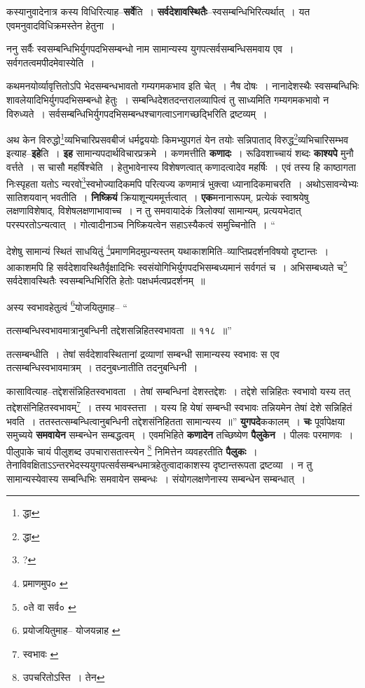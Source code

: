 \documentclass[article,12pt,a4paper]{memoir}
\begin{document}
	  \pstart कस्यानुवादेनात्र कस्य विधिरित्या\leavevmode{}ह--\textbf{सर्वे}ति । \textbf{सर्वदेशावस्थितैः}--स्वसम्बन्धिभिरित्यर्थात् । यत एवमनुवादविधिक्रमस्तेन हेतुना ।
	\pend
      

	  \pstart ननु सर्वैः स्वसम्बन्धिभिर्युगपदभिसम्बन्धो नाम सामान्यस्य युगपत्सर्वसम्बन्धिसमवाय एव । सर्वगतत्वमपीदमेवास्येति ।
	\pend
      

	  \pstart कथमनयोर्व्यावृत्तितोऽपि भेदसम्बन्धभावतो गम्यगमकभाव इति चेत् । नैष दोषः । नानादेशस्थैः स्वसम्बन्धिभिः शावलेयादिभिर्युगपदभिसम्बन्धो हेतुः । सम्बन्धिदेशतदन्तरालव्यापित्वं तु साध्यमिति गम्यगमकभावो न विरुध्यते । सर्वसम्बन्धिभिर्युगपदभिसम्बन्धश्चागत्वाऽनागच्छद्भिरिति द्रष्टव्यम् ।
	\pend
      

	  \pstart अथ केन विरुद्धो\footnote{द्धा}\-व्यभिचारिप्रसवबीजं धर्मद्वययोः किमभ्युपगतं येन तयोः सन्निपाताद् विरुद्ध\footnote{द्धा}\-व्यभिचारिसम्भव इत्याह--\textbf{इहे}ति । \textbf{इह} सामान्यपदार्थविचारप्रक्रमे । कणमत्तीति \textbf{कणादः} । रूढिवशाच्चायं शब्दः \textbf{काश्यपे} मुनौ वर्त्तते । स चासौ महर्षिश्चेति । हेतुभावेनास्य विशेषणत्वात् कणादत्वादेव महर्षिः । एवं तस्य हि काष्ठागता निःस्पृहता यतोऽ न्यरवो\footnote{?}\-स्वभोज्यादिकमपि परित्यज्य कणमात्रं भुक्त्वा ध्यानादिकमाचरति । अथोऽसावन्येभ्यः सातिशयवान् भवतीति । \textbf{निष्क्रियं} क्रियाशून्यममूर्त्तत्वात् । \textbf{एक}मनानारूपम्, प्रत्येकं स्वाश्रयेषु लक्षणाविशेषाद्, विशेषलक्षणाभावाच्च । न तु समवायादेकं त्रिलोक्यां सामान्यम्, प्रत्ययभेदात् परस्परतोऽन्यत्वात् । गोत्वादीनाञ्च निष्क्रियत्वेन सहाऽस्यैकत्वं समुच्चिनोति ।  \leavevmode{} “
	  
	देशेषु सामान्यं स्थितं साधयितुं \footnote{प्रमाणमुप० \cite{dp-msC}}\-प्रमाणमिदमुपन्यस्तम् यथाकाशमिति--व्याप्तिप्रदर्शनविषयो दृष्टान्तः । आकाशमपि हि सर्वदेशावस्थितैर्वृक्षादिभिः स्वसंयोगिभिर्युगपदभिसम्बध्यमानं सर्वगतं च । अभिसम्बध्यते च\footnote{०ते वा सर्व० \cite{dp-msB}} सर्वदेशावस्थितैः स्वसम्बन्धिभिरिति हेतोः पक्षधर्मत्वप्रदर्शनम् ॥ 
	  
	अस्य स्वभावहेतुत्वं \footnote{प्रयोजयितुमाह--\cite{dp-msA} \cite{dp-msB} \cite{dp-edP} \cite{dp-edH} \cite{dp-edN} योजयन्नाह \cite{dp-edE}}\-योजयितुमाह-- “
	  
	तत्सम्बन्धिस्वभावमात्रानुबन्धिनी तद्देशसन्निहितस्वभावता ॥ ११८ ॥” 
	  
	तत्सम्बन्धीति । तेषां सर्वदेशावस्थितानां द्रव्याणां सम्बन्धी सामान्यस्य स्वभावः स एव तत्सम्बन्धिस्वभावमात्रम् । तदनुबध्नातीति तदनुबन्धिनी । 
	  
	कासावित्याह--तद्देशसंन्निहितस्वभावता । तेषां सम्बन्धिनां देशस्तद्देशः । तद्देशे सन्निहितः स्वभावो यस्य तत् तद्देशसंनिहितस्वभावम्\footnote{स्वभावः \cite{dp-msC} \cite{dp-msD} \cite{dp-edE}} । तस्य भावस्तत्ता । यस्य हि येषां सम्बन्धी स्वभावः तन्नियमेन तेषां देशे सन्निहितं भवति । ततस्तत्सम्बन्धित्वानुबन्धिनी तद्देशसंनिहितता सामान्यस्य ॥” \textbf{युगपदे}ककालम् । \textbf{चः} पूर्वापेक्षया समुच्यये \textbf{समवायेन} सम्बन्धेन सम्बद्धत्वम् । एवमभिहिते \textbf{कणादेन} तच्छिष्येण \textbf{पैलुकेन} । पीलवः परमाणवः । पीलुपाके चायं पीलुशब्द उपचारासतास्त्त्येन \footnote{उपचरितोऽस्ति । तेन} निमित्तेन व्यवहरतीति \textbf{पैलुकः} । तेनाविवक्षिताऽऽन्तरभेदस्ययुगपत्सर्वसम्बन्धमात्रहेतुत्वादाकाशस्य दृष्टान्तरूपता द्रष्टव्या । न तु सामान्यस्येवास्य सम्बन्धिभिः समवायेन सम्बन्धः । संयोगलक्षणेनास्य सम्बन्धेन सम्बन्धात् ।
	\pend
      
\end{document}
